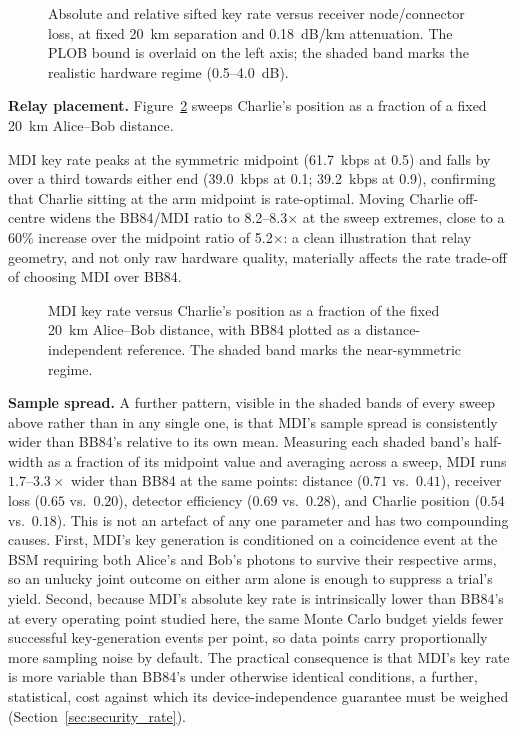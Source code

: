 \documentclass[12pt]{article}
\begin{document}
\begin{figure}[hbtp]
    \centering
    
    \caption{Absolute and relative sifted key rate versus receiver node/connector loss, at fixed 20~km separation and 0.18~dB/km attenuation. The PLOB bound is overlaid on the left axis; the shaded band marks the realistic hardware regime (0.5--4.0~dB).}
    \label{fig:p2p_node_loss}
\end{figure}

\textbf{Relay placement.} Figure~\ref{fig:p2p_charlie_pos} sweeps Charlie's position as a fraction of a fixed 20~km Alice--Bob distance.

MDI key rate peaks at the symmetric midpoint (61.7~kbps at 0.5) and falls by over a third towards either end (39.0~kbps at 0.1; 39.2~kbps at 0.9), confirming that Charlie sitting at the arm midpoint is rate-optimal. Moving Charlie off-centre widens the BB84/MDI ratio to 8.2--8.3$\times$ at the sweep extremes, close to a 60\% increase over the midpoint ratio of 5.2$\times$: a clean illustration that relay geometry, and not only raw hardware quality, materially affects the rate trade-off of choosing MDI over BB84.

\begin{figure}[htbp]
    \centering
    
    \caption{MDI key rate versus Charlie's position as a fraction of the fixed 20~km Alice--Bob distance, with BB84 plotted as a distance-independent reference. The shaded band marks the near-symmetric regime.}
    \label{fig:p2p_charlie_pos}
\end{figure}

\textbf{Sample spread.} A further pattern, visible in the shaded bands of every sweep above rather than in any single one, is that MDI's sample spread is consistently wider than BB84's relative to its own mean. Measuring each shaded band's half-width as a fraction of its midpoint value and averaging across a sweep, MDI runs $1.7$--$3.3\times$ wider than BB84 at the same points: distance ($0.71$ vs.\ $0.41$), receiver loss ($0.65$ vs.\ $0.20$), detector efficiency ($0.69$ vs.\ $0.28$), and Charlie position ($0.54$ vs.\ $0.18$). This is not an artefact of any one parameter and has two compounding causes. First, MDI's key generation is conditioned on a coincidence event at the BSM requiring both Alice's and Bob's photons to survive their respective arms, so an unlucky joint outcome on either arm alone is enough to suppress a trial's yield. Second, because MDI's absolute key rate is intrinsically lower than BB84's at every operating point studied here, the same Monte Carlo budget yields fewer successful key-generation events per point, so data points carry proportionally more sampling noise by default. The practical consequence is that MDI's key rate is more variable than BB84's under otherwise identical conditions, a further, statistical, cost against which its device-independence guarantee must be weighed (Section~\ref{sec:security_rate}).
\end{document}
